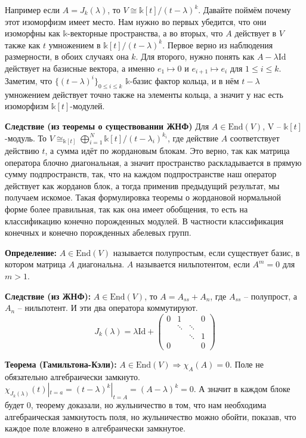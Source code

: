 \documentclass[a4paper, 12pt]{book}
\begin{document}
Например если $A=J_k(\lambda)$, то $V\cong\mathbb{k}[t]/(t-\lambda)^k$. Давайте
поймём почему этот изоморфизм имеет место. Нам нужно во первых убедится, что они
изоморфны как $\mathbb{k}$-векторные пространства, а во вторых, что $A$
действует в $V$ также как $t$ умножением в $\mathbb{k}[t]/(t-\lambda)^k$. Первое
верно из наблюдения размерности, в обоих случаях она $k$. Для второго, нужно
понять как $A-\lambda\text{Id}$ действует на базисные вектора, а именно $e_1
\mapsto 0$ и $e_{i+1}\mapsto e_i$ для $1\leq i \le k$. Заметим, что
$\{(t-\lambda)^i\}_{0\leq i\le k}$ $\mathbb{k}$-базис фактор кольца, и в нём
$t-\lambda$ умножением действует точно также на элементы кольца, а значит у нас
есть изоморфизм $\mathbb{k}[t]$-модулей.

\textbf{Следствие (из теоремы о существовании ЖНФ)}
Для $A\in\text{End}(V)$, V – $\mathbb{k}[t]$-модуль. То $V\cong_{\mathbb{k}[t]}
\bigoplus_{i=1}^N\mathbb{k}[t]/(t-\lambda_i)^{k_i}$, где действие $A$
соответствует действию $t$, а сумма идёт по жордановым блокам. Это верно, так
как матрица оператора блочно диагональная, а значит пространство раскладывается
в прямую сумму подпространств, так, что на каждом подпространстве наш оператор
действует как жорданов блок, а тогда применив предыдущий результат, мы получаем
искомое. Такая формулировка теоремы о жордановой нормальной форме более
правильная, так как она имеет обобщения, то есть на классификацию конечно
порожденных модулей. В частности классификация конечных и конечно порожденных
абелевых групп.

\textbf{Определение:} $A\in\text{End}(V)$ называется полупростым, если
существует базис, в котором матрица $A$ диагональна. $A$ называется
нильпотентом, если $A^m=0$ для $m>1$.

\textbf{Следствие (из ЖНФ):} $A\in\text{End}(V)$, то $A=A_{ss}+A_n$, где
$A_{ss}$ – полупрост, а $A_n$ – нильпотент. И эти два оператора коммутируют.
\[J_k(\lambda)=\lambda\text{Id}+\left(\begin{array}{cccc}
    0 & 1      &        & 0\\
      & \ddots & \ddots &  \\
      &        & \ddots & 1\\
    0 &        &        & 0
    \end{array}\right)\]

\textbf{Теорема (Гамильтона-Кэли):}
 $A\in\text{End}(V)\Rightarrow\chi_A(A)=0$. Поле не обязательно алгебраически
 замкнуто. $\chi_{J_k(\lambda)}(t)|_{t=a}=(t-\lambda)^k|_{t=A}=(A-\lambda)^k=0$.
 А значит в каждом блоке будет 0, теорему доказали, но жульничество в том, что
 нам необходима алгебраическая замкнутость поля, но жульничество можно обойти,
 показав, что каждое поле вложено в алгебраически замкнутое. 
\end{document}
